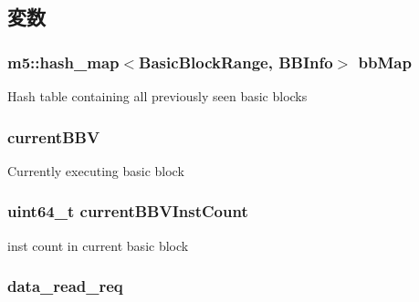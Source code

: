 \subsection{変数}
\hypertarget{classAtomicSimpleCPU_a06bfab070d35f298897393f7ee6e066c}{
\subsubsection[{bbMap}]{\setlength{\rightskip}{0pt plus 5cm}m5::hash\_\-map$<${\bf BasicBlockRange}, {\bf BBInfo}$>$ {\bf bbMap}}}
\label{classAtomicSimpleCPU_a06bfab070d35f298897393f7ee6e066c}
Hash table containing all previously seen basic blocks \hypertarget{classAtomicSimpleCPU_aa13454a445c3711abe528bdd288a953c}{
\subsubsection[{currentBBV}]{ {\bf currentBBV}}}
\label{classAtomicSimpleCPU_aa13454a445c3711abe528bdd288a953c}
Currently executing basic block \hypertarget{classAtomicSimpleCPU_a375bb98c835fcacb306ec154ac3c7f85}{
\subsubsection[{currentBBVInstCount}]{\setlength{\rightskip}{0pt plus 5cm}uint64\_\-t {\bf currentBBVInstCount}}}
\label{classAtomicSimpleCPU_a375bb98c835fcacb306ec154ac3c7f85}
inst count in current basic block \hypertarget{classAtomicSimpleCPU_a836513db061d14f39d79751c40fa9951}{
\subsubsection[{data\_\-read\_\-req}]{ {\bf data\_\-read\_\-req}}}
